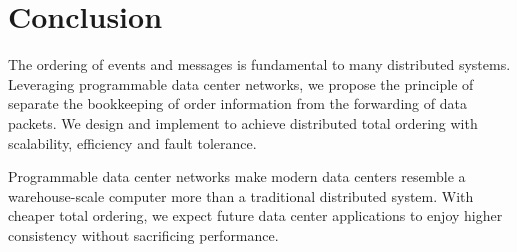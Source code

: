 \section{Conclusion}
\label{sec:conclusion}

The ordering of events and messages is fundamental to many distributed systems.
Leveraging programmable data center networks, we propose the principle of separate the bookkeeping of order information from the forwarding of data packets.
We design and implement \sys to achieve distributed total ordering with scalability, efficiency and fault tolerance.

Programmable data center networks make modern data centers resemble a warehouse-scale computer more than a traditional distributed system.
With cheaper total ordering, we expect future data center applications to enjoy higher consistency without sacrificing performance.